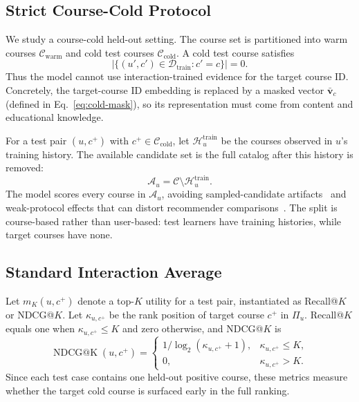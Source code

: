 \documentclass[letterpaper]{article}
\begin{document}
\subsection{Strict Course-Cold Protocol}
We study a course-cold held-out setting. The course set is partitioned into warm courses \(\mathcal{C}_{\mathrm{warm}}\) and cold test courses \(\mathcal{C}_{\mathrm{cold}}\). A cold test course satisfies
\begin{equation}
|\{(u',c')\in \mathcal{D}_{\mathrm{train}}: c'=c\}|=0.
\end{equation}
Thus the model cannot use interaction-trained evidence for the target course ID. Concretely, the target-course ID embedding is replaced by a masked vector \(\bar{\mathbf{v}}_c\) (defined in Eq.~\eqref{eq:cold-mask}), so its representation must come from content and educational knowledge.

For a test pair \((u,c^+)\) with \(c^+\in\mathcal{C}_{\mathrm{cold}}\), let \(\mathcal{H}^{\mathrm{train}}_u\) be the courses observed in \(u\)'s training history. The available candidate set is the full catalog after this history is removed:
\begin{equation}
\mathcal{A}_u=\mathcal{C}\setminus \mathcal{H}^{\mathrm{train}}_u .
\label{eq:candidate-set}
\end{equation}
The model scores every course in \(\mathcal{A}_u\), avoiding sampled-candidate artifacts~\cite{krichene2020sampled,li2024itemsampling} and weak-protocol effects that can distort recommender comparisons~\cite{dacrema2019progress,hidasi2023flaws}. The split is course-based rather than user-based: test learners have training histories, while target courses have none.

\subsection{Standard Interaction Average}
Let \(m_K(u,c^+)\) denote a top-\(K\) utility for a test pair, instantiated as Recall@\(K\) or NDCG@\(K\). Let \(\kappa_{u,c^+}\) be the rank position of target course \(c^+\) in \(\Pi_u\). Recall@\(K\) equals one when \(\kappa_{u,c^+}\le K\) and zero otherwise, and NDCG@\(K\) is
\begin{equation}
\operatorname{NDCG@K}(u,c^+)=
\begin{cases}
1/\log_2(\kappa_{u,c^+}+1), & \kappa_{u,c^+}\le K,\\
0, & \kappa_{u,c^+}>K.
\end{cases}
\label{eq:topk-utility}
\end{equation}
Since each test case contains one held-out positive course, these metrics measure whether the target cold course is surfaced early in the full ranking.
\end{document}
